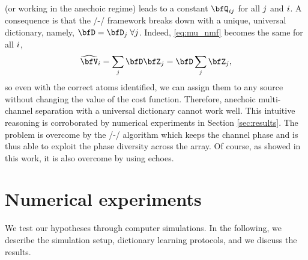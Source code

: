  (or working in the anechoic regime) leads to a constant $\vQ_{\idxMicSrc}$ for all $j$ and $i$.
A consequence is that the \MU/-\NMF/ framework breaks down with a unique, universal dictionary, namely, $\mD = \mD_j\;\forall j$.
Indeed, \eqref{eq:mu_nmf} becomes the same for all $i$,
\begin{equation*}
    \wh{\mV}_\idxMic = \sum_{\idxSrc} \mD \mZ_\idxSrc = \mD \sum_\idxSrc \mZ_\idxSrc,
\end{equation*}
so even with the correct atoms identified, we can assign them to any source without changing the value of the cost function.
Therefore, anechoic multi-channel separation with a universal dictionary cannot work well.
This intuitive reasoning is corroborated by numerical experiments in Section \ref{sec:results}.
The problem is overcome by the \EM/-\NMF/ algorithm which keeps the channel phase and is thus able to exploit the phase diversity across the array.
Of course, as showed in this work, it is also overcome by using echoes.

\section{Numerical experiments}

We test our hypotheses through computer simulations.
In the following, we describe the simulation setup, dictionary learning protocols, and we discuss the results.

